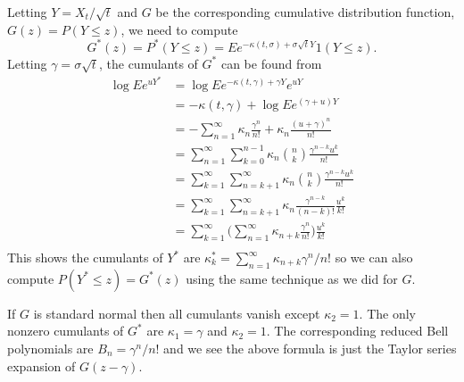 \documentclass[11pt]{article}
\theoremstyle{remark}
\begin{document}
Letting \(Y = X_t/\sqrt{t}\) and \(G\) be the corresponding cumulative
distribution function, \(G(z) = P(Y\le z)\), we need to compute
\[
G^*(z) = P^*(Y\le z) = Ee^{-\kappa(t,\sigma) + \sigma\sqrt{t}Y}1(Y\le z).
\]
Letting \(\gamma = \sigma\sqrt{t}\), the cumulants of \(G^*\) can be found from
\begin{align*}
\log E e^{uY^*} &= \log E e^{-\kappa(t,\gamma) + \gamma Y} e^{uY}\\
&= -\kappa(t, \gamma) + \log E e^{(\gamma + u) Y}\\
&= -\sum_{n=1}^\infty \kappa_n \frac{\gamma^n}{n!} 
	+ \kappa_n \frac{(u + \gamma)^n}{n!}\\
&= \sum_{n=1}^\infty \sum_{k=0}^{n-1} \kappa_n \binom{n}{k}
	\frac{\gamma^{n - k}u^k}{n!}\\
&= \sum_{k=1}^\infty \sum_{n=k + 1}^\infty \kappa_n 
	\binom{n}{k}\frac{\gamma^{n - k}u^k}{n!}\\
&= \sum_{k=1}^\infty \sum_{n=k + 1}^\infty \kappa_n \frac{\gamma^{n-k}}{(n-k)!}
	\frac{u^k}{k!}\\
&= \sum_{k=1}^\infty 
	\bigl(\sum_{n=1}^\infty \kappa_{n+k} \frac{\gamma^n}{n!}\bigr)
	\frac{u^k}{k!}\\
\end{align*}
This shows the cumulants of \(Y^*\) are 
\(\kappa^*_k = \sum_{n=1}^\infty \kappa_{n + k}\gamma^n/n!\)
so we can also compute \(P(Y^* \le z) = G^*(z)\) using the same
technique as we did for \(G\).

If \(G\) is standard normal then all cumulants vanish except \(\kappa_2 = 1\). The only nonzero cumulants of \(G^*\) are \(\kappa_1 = \gamma\)
and \(\kappa_2 = 1\). The corresponding reduced Bell polynomials
are \(B_n = \gamma^n/n!\) and we see the above formula is just
the Taylor series expansion of \(G(z - \gamma)\).
%
%
\end{document}

